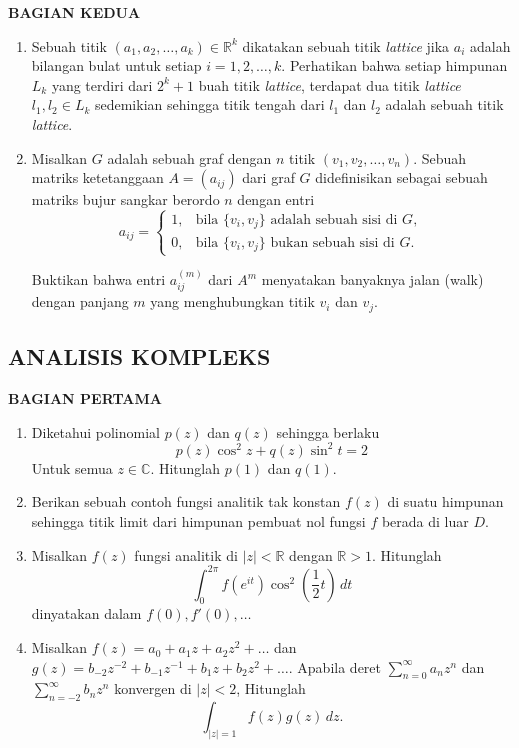 \documentclass[12pt,twoside]{article}
\begin{document}
\newpage \textbf{BAGIAN KEDUA}
\begin{enumerate}
	\item Sebuah titik $(a_1,a_2,\dots,a_k)\in \mathbb{R}^k$ dikatakan sebuah titik \textit{lattice} jika $a_i$ adalah bilangan bulat untuk setiap $i = 1,2,\dots,k$. Perhatikan bahwa setiap himpunan $L_k$ yang terdiri dari $2^k+1$ buah titik \textit{lattice}, terdapat dua titik \textit{lattice} $l_1,l_2\in L_k$ sedemikian sehingga titik tengah dari $l_1$ dan $l_2$ adalah sebuah titik \textit{lattice}.
	\item Misalkan $G$ adalah sebuah graf dengan $n$ titik $(v_1, v_2, \ldots, v_n)$. Sebuah matriks
	      ketetanggaan $A = (a_{ij})$ dari graf $G$ didefinisikan sebagai sebuah matriks
	      bujur sangkar berordo $n$ dengan entri
	      \[
		      a_{ij} =
		      \begin{cases}
			      1, & \text{bila } \{v_i, v_j\} \text{ adalah sebuah sisi di } G, \\[4pt]
			      0, & \text{bila } \{v_i, v_j\} \text{ bukan sebuah sisi di } G.
		      \end{cases}
	      \]

	      Buktikan bahwa entri $a^{(m)}_{ij}$ dari $A^m$ menyatakan banyaknya jalan (walk)
	      dengan panjang $m$ yang menghubungkan titik $v_i$ dan $v_j$.

\end{enumerate}
\pagebreak
\subsection{ANALISIS KOMPLEKS}
\textbf{BAGIAN PERTAMA}
\begin{enumerate}
	\item Diketahui polinomial $p(z)$ dan $q(z)$ sehingga berlaku
	      \begin{equation*}
		      p(z)\cos^2 z + q(z)\sin^2 t = 2
	      \end{equation*}
	      Untuk semua $z \in \mathbb{C}.$ Hitunglah $p(1)$ dan $q(1)$.

	\item Berikan sebuah contoh fungsi analitik tak konstan $f(z)$ di suatu himpunan sehingga titik limit dari himpunan pembuat nol fungsi $f$ berada di luar $D$.

	\item Misalkan $f(z)$ fungsi analitik di $|z|<\mathbb{R}$ dengan $\mathbb{R} > 1$. Hitunglah
	      \begin{equation*}
		      \displaystyle\int_{0}^{2\pi} f(e^{it}) \cos^2 \left(\dfrac{1}{2}t\right)\,dt
	      \end{equation*}
	      dinyatakan dalam $f(0),f'(0),\dots$

	\item Misalkan $f(z) = a_0 + a_1z +a_2z^2 +\dots$ dan $g(z)= b_{-2}z^{-2}+b_{-1}z^{-1}+b_1z+b_2z^2+\dots$. Apabila deret $\displaystyle\sum_{n=0}^{\infty} a_nz^n$ dan $\displaystyle\sum_{n=-2}^{\infty}b_nz^n$ konvergen di $|z|<2$, Hitunglah
	      \begin{equation*}
		      \displaystyle\int_{|z|=1}^{} f(z)g(z)\,dz.
	      \end{equation*}
\end{enumerate}
\end{document}
